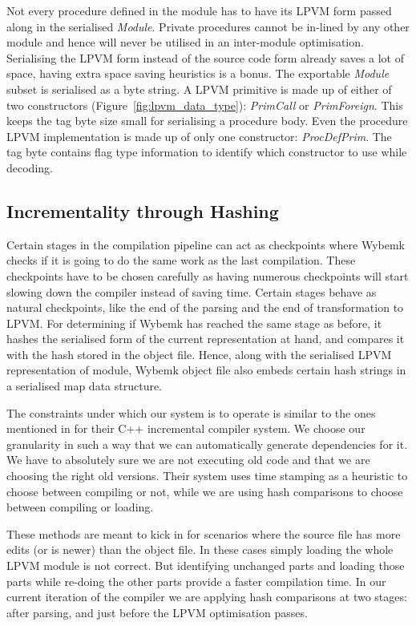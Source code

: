 Not every procedure defined in the module has to have its LPVM form passed
along in the serialised \textit{Module}. Private procedures cannot be in-lined
by any other module and hence will never be utilised in an inter-module
optimisation. Serialising the LPVM form instead of the source code form already
saves a lot of space, having extra space saving heuristics is a bonus. The
exportable \textit{Module} subset is serialised as a byte string. A LPVM
primitive is made up of either of two constructors
(Figure~\ref{fig:lpvm_data_type}): \textit{PrimCall} or
\textit{PrimForeign}. This keeps the tag byte size small for serialising a
procedure body. Even the procedure LPVM implementation is made up of only one
constructor: \textit{ProcDefPrim}. The tag byte contains flag type information
to identify which constructor to use while decoding.



\subsection{Incrementality through Hashing}

Certain stages in the compilation pipeline can act as checkpoints where Wybemk
checks if it is going to do the same work as the last compilation. These
checkpoints have to be chosen carefully as having numerous checkpoints will
start slowing down the compiler instead of saving time. Certain stages behave
as natural checkpoints, like the end of the parsing and the end of
transformation to LPVM. For determining if Wybemk has reached the same stage as
before, it hashes the serialised form of the current representation at hand,
and compares it with the hash stored in the object file. Hence, along with the
serialised LPVM representation of module, Wybemk object file also embeds
certain hash strings in a serialised map data structure.

The constraints under which our system is to operate is similar to the ones
mentioned in \cite{cpp_compiler} for their C++ incremental compiler system. We
choose our granularity in such a way that we can automatically generate
dependencies for it. We have to absolutely sure we are not executing old code
and that we are choosing the right old versions. Their system uses time
stamping as a heuristic to choose between compiling or not, while we are using
hash comparisons to choose between compiling or loading.

These methods are meant to kick in for scenarios where the source file has more
edits (or is newer) than the object file. In these cases simply loading the
whole LPVM module is not correct. But identifying unchanged parts and loading
those parts while re-doing the other parts provide a faster compilation
time. In our current iteration of the compiler we are applying hash comparisons
at two stages: after parsing, and just before the LPVM optimisation passes.

